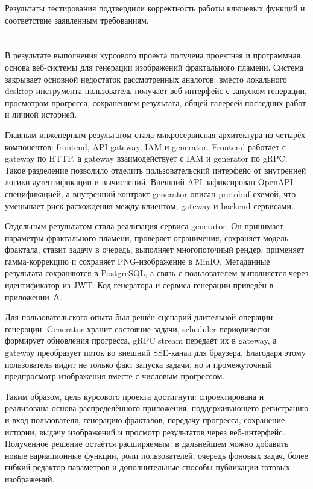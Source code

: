 Результаты тестирования подтвердили корректность работы ключевых функций и соответствие заявленным требованиям.

\newpage

\section*{}

В результате выполнения курсового проекта получена проектная и программная основа веб-системы для генерации изображений фрактального пламени. Система закрывает основной недостаток рассмотренных аналогов: вместо локального desktop-инструмента пользователь получает веб-интерфейс с запуском генерации, просмотром прогресса, сохранением результата, общей галереей последних работ и личной историей.

Главным инженерным результатом стала микросервисная архитектура из четырёх компонентов: frontend, API gateway, IAM и generator. Frontend работает с gateway по HTTP, а gateway взаимодействует с IAM и generator по gRPC. Такое разделение позволило отделить пользовательский интерфейс от внутренней логики аутентификации и вычислений. Внешний API зафиксирован OpenAPI-спецификацией, а внутренний контракт generator описан protobuf-схемой, что уменьшает риск расхождения между клиентом, gateway и backend-сервисами.

Отдельным результатом стала реализация сервиса generator. Он принимает параметры фрактального пламени, проверяет ограничения, сохраняет модель фрактала, ставит задачу в очередь, выполняет многопоточный рендер, применяет гамма-коррекцию и сохраняет PNG-изображение в MinIO. Метаданные результата сохраняются в PostgreSQL, а связь с пользователем выполняется через идентификатор из JWT. Код генератора и сервиса генерации приведён в \hyperref[app:code]{приложении~А}.

Для пользовательского опыта был решён сценарий длительной операции генерации. Generator хранит состояние задачи, scheduler периодически формирует обновления прогресса, gRPC stream передаёт их в gateway, а gateway преобразует поток во внешний SSE-канал для браузера. Благодаря этому пользователь видит не только факт запуска задачи, но и промежуточный предпросмотр изображения вместе с числовым прогрессом.

Таким образом, цель курсового проекта достигнута: спроектирована и реализована основа распределённого приложения, поддерживающего регистрацию и вход пользователя, генерацию фракталов, передачу прогресса, сохранение истории, выдачу изображений и просмотр результатов через веб-интерфейс. Полученное решение остаётся расширяемым: в дальнейшем можно добавить новые вариационные функции, роли пользователей, очередь фоновых задач, более гибкий редактор параметров и дополнительные способы публикации готовых изображений.

